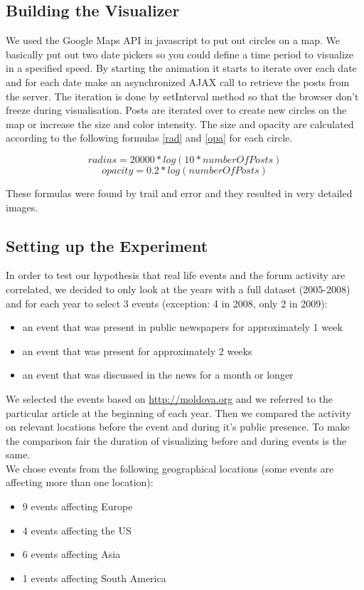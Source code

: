 \documentclass[11pt,a4paper,english]{article}
\begin{document}
		\subsection{Building the Visualizer}
		We used the Google Maps API in javascript to put out circles on a map. We basically put out two date pickers so you could define a time period to visualize in a specified speed. By starting the animation it starts to iterate over each date and for each date make an asynchronized AJAX call to retrieve the posts from the server. The iteration is done by setInterval method so that the browser don't freeze during visualisation. Posts are iterated over to create new circles on the map or increase the size and color intensity. The size and opacity are calculated according to the following formulas \ref{rad} and \ref{opa} for each circle.

		\begin{equation} \label{rad}
			 radius = 20000*log(10* number Of Posts)
		\end{equation}
		\begin{equation} \label{opa}
			 opacity = 0.2*log( number Of Posts )
		\end{equation}

		These formulas were found by trail and error and they resulted in very detailed images.
		
		\subsection{Setting up the Experiment}
		In order to test our hypothesis that real life events and the forum activity are correlated, we decided to only look at the years with a full dataset (2005-2008) and for each year to select 3 events (exception: 4 in 2008, only 2 in 2009):
		\begin{itemize}
			\item an event that was present in public newspapers for approximately 1 week
			\item an event that was present for approximately 2 weeks
			\item an event that was discussed in the news for a month or longer
		\end{itemize}
		We selected the events based on \url{http://moldova.org} and we referred to the particular article at the beginning of each year. Then we compared the activity on relevant locations before the event and during it's public presence. To make the comparison fair the duration of visualizing before and during events is the same.
		\\ We chose events from the following geographical locations (some events are affecting more than one location):
		\begin{itemize}
			\item 9 events affecting Europe
			\item 4 events affecting the US
			\item 6 events affecting Asia
			\item 1 events affecting South America
		\end{itemize}
\end{document}
